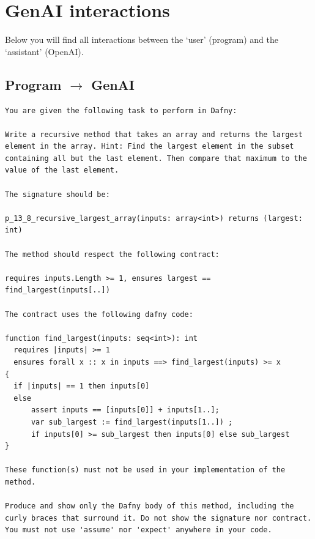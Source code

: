 \documentclass{article}
\begin{document}
\section*{GenAI interactions}
Below you will find all interactions between the `user' (program) and the `assistant' (OpenAI).
\subsection*{Program $\rightarrow$ GenAI}
\begin{lstlisting}
You are given the following task to perform in Dafny:

Write a recursive method that takes an array and returns the largest element in the array. Hint: Find the largest element in the subset containing all but the last element. Then compare that maximum to the value of the last element.

The signature should be:

p_13_8_recursive_largest_array(inputs: array<int>) returns (largest: int)

The method should respect the following contract:

requires inputs.Length >= 1, ensures largest == find_largest(inputs[..])

The contract uses the following dafny code:

function find_largest(inputs: seq<int>): int
  requires |inputs| >= 1
  ensures forall x :: x in inputs ==> find_largest(inputs) >= x
{
  if |inputs| == 1 then inputs[0]
  else 
      assert inputs == [inputs[0]] + inputs[1..];
      var sub_largest := find_largest(inputs[1..]) ;
      if inputs[0] >= sub_largest then inputs[0] else sub_largest
}

These function(s) must not be used in your implementation of the method.

Produce and show only the Dafny body of this method, including the curly braces that surround it. Do not show the signature nor contract. You must not use 'assume' nor 'expect' anywhere in your code.
\end{lstlisting}
\end{document}
